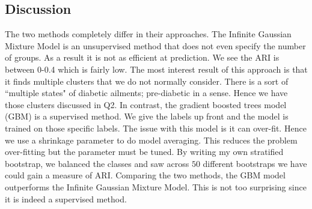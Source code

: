 \documentclass[12pt, centerh1]{article}
\begin{document}
\subsection*{Discussion}
The two methods completely differ in their approaches. The Infinite Gaussian Mixture Model is an unsupervised method that does not even specify the number of groups. As a result it is not as efficient at prediction. We see the ARI is between 0-0.4 which is fairly low. The most interest result of this approach is that it finds multiple clusters that we do not normally consider. There is a sort of ``multiple states" of diabetic ailments; pre-diabetic in a sense. Hence we have those clusters discussed in Q2. In contrast, the gradient boosted trees model (GBM) is a supervised method. We give the labels up front and the model is trained on those specific labels. The issue with this model is it can over-fit. Hence we use a shrinkage parameter to do model averaging. This reduces the problem over-fitting but the parameter must be tuned. By writing my own stratified bootstrap, we balanced the classes and saw across $50$ different bootstraps we have could gain a measure of ARI. Comparing the two methods, the GBM model outperforms the Infinite Gaussian Mixture Model. This is not too surprising since it is indeed a supervised method. 
\end{document}
